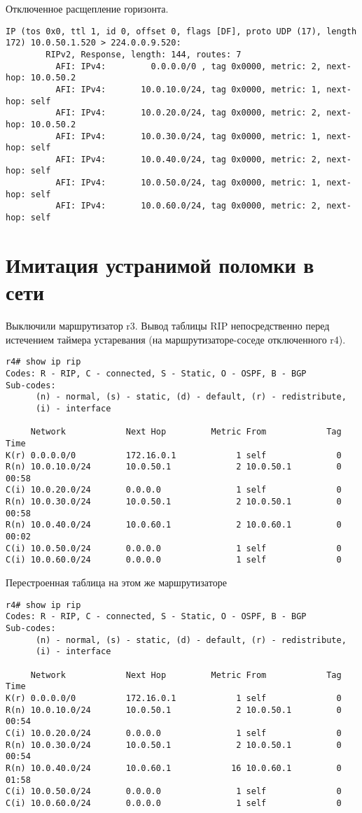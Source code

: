 \documentclass[a4paper,12pt]{article}
\begin{document}
Отключенное расщепление горизонта.
\begin{Verbatim}
IP (tos 0x0, ttl 1, id 0, offset 0, flags [DF], proto UDP (17), length 172) 10.0.50.1.520 > 224.0.0.9.520:
        RIPv2, Response, length: 144, routes: 7
          AFI: IPv4:         0.0.0.0/0 , tag 0x0000, metric: 2, next-hop: 10.0.50.2
          AFI: IPv4:       10.0.10.0/24, tag 0x0000, metric: 1, next-hop: self
          AFI: IPv4:       10.0.20.0/24, tag 0x0000, metric: 2, next-hop: 10.0.50.2
          AFI: IPv4:       10.0.30.0/24, tag 0x0000, metric: 1, next-hop: self
          AFI: IPv4:       10.0.40.0/24, tag 0x0000, metric: 2, next-hop: self
          AFI: IPv4:       10.0.50.0/24, tag 0x0000, metric: 1, next-hop: self
          AFI: IPv4:       10.0.60.0/24, tag 0x0000, metric: 2, next-hop: self
\end{Verbatim}


\section{Имитация устранимой поломки в сети}

Выключили маршрутизатор r3.
Вывод таблицы RIP непосредственно перед истечением таймера устаревания (на маршрутизаторе-соседе отключенного r4).

\begin{Verbatim}
r4# show ip rip
Codes: R - RIP, C - connected, S - Static, O - OSPF, B - BGP
Sub-codes:
      (n) - normal, (s) - static, (d) - default, (r) - redistribute,
      (i) - interface

     Network            Next Hop         Metric From            Tag Time
K(r) 0.0.0.0/0          172.16.0.1            1 self              0
R(n) 10.0.10.0/24       10.0.50.1             2 10.0.50.1         0 00:58
C(i) 10.0.20.0/24       0.0.0.0               1 self              0
R(n) 10.0.30.0/24       10.0.50.1             2 10.0.50.1         0 00:58
R(n) 10.0.40.0/24       10.0.60.1             2 10.0.60.1         0 00:02
C(i) 10.0.50.0/24       0.0.0.0               1 self              0
C(i) 10.0.60.0/24       0.0.0.0               1 self              0
\end{Verbatim}

Перестроенная таблица на этом же маршрутизаторе

\begin{Verbatim}
r4# show ip rip
Codes: R - RIP, C - connected, S - Static, O - OSPF, B - BGP
Sub-codes:
      (n) - normal, (s) - static, (d) - default, (r) - redistribute,
      (i) - interface

     Network            Next Hop         Metric From            Tag Time
K(r) 0.0.0.0/0          172.16.0.1            1 self              0
R(n) 10.0.10.0/24       10.0.50.1             2 10.0.50.1         0 00:54
C(i) 10.0.20.0/24       0.0.0.0               1 self              0
R(n) 10.0.30.0/24       10.0.50.1             2 10.0.50.1         0 00:54
R(n) 10.0.40.0/24       10.0.60.1            16 10.0.60.1         0 01:58
C(i) 10.0.50.0/24       0.0.0.0               1 self              0
C(i) 10.0.60.0/24       0.0.0.0               1 self              0
\end{Verbatim}
\end{document}
